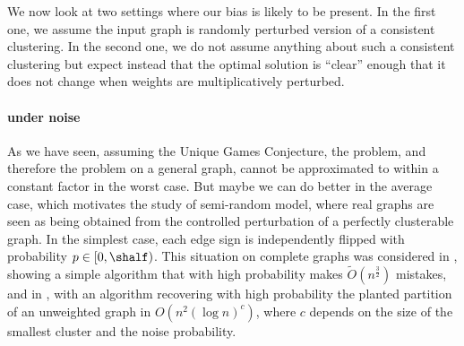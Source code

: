 We now look at two settings where our bias is likely to be present.  In the first one, we assume the
input graph is randomly perturbed version of a consistent clustering. In the second one, we do not
assume anything about such a consistent clustering but expect instead that the optimal solution is
\enquote{clear} enough that it does not change when weights are multiplicatively perturbed.

\paragraph{\pcc{} under noise}

As we have seen, assuming the Unique Games Conjecture, the \mmc{} problem, and therefore
the \pcc{} problem on a general graph, cannot be approximated to within a constant factor in the worst
case.  But maybe we can do better in the average case, which motivates the study of semi-random
model, where real graphs are seen as being obtained from the controlled perturbation of a perfectly
clusterable graph. In the simplest case, each edge sign is independently flipped with probability
$p \in [0, \shalf)$. This situation on complete graphs was considered in \autocite[Section
6]{Bansal2002}, showing a simple algorithm that with high probability makes
$\tilde{O}(n^\frac{3}{2})$ mistakes, and in \autocite[Theorem 2.6]{Ben-Dor99}, with an algorithm
recovering with high probability the planted partition of an unweighted graph in $O(n^2(\log n)^c)$,
where $c$ depends on the size of the smallest cluster and the noise probability.

